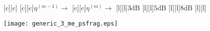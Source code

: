 \documentclass{article}
\begin{document}
\begin{figure}[htb]
  \begin{center}

        [c][c]{}
        [c][c]{$\eta^{(m-1)}\rightarrow$}
        [c][c]{$\eta^{(m)}\rightarrow$}
        [l][l]{$\mathrm{3dB}$}
        [l][l]{$\mathrm{5dB}$}
	[l]{$\mathrm{8dB}$}
	[l]{$\mathrm{}$}
               
	
    \texttt{[image: generic\_3\_me\_psfrag.eps]}
    \end{center}
\end{figure}
\end{document}
